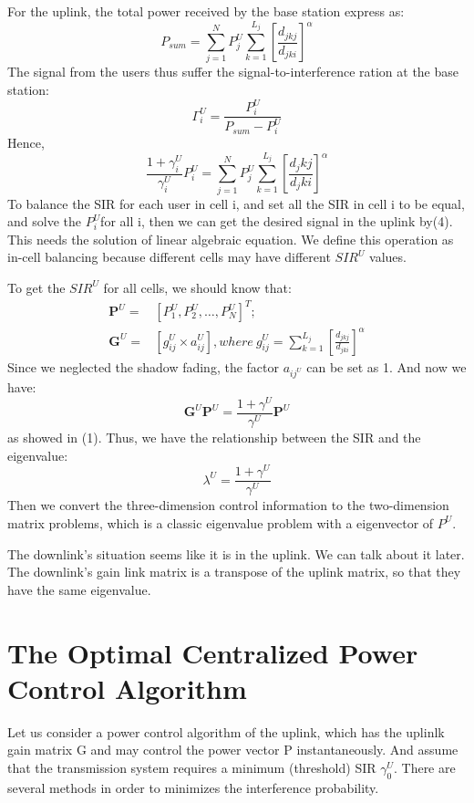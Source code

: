 \documentclass[conference]{IEEEtran}
\begin{document}
For the uplink, the total power received by the base station express as:\begin{equation}
P_{sum} = \sum_{j=1}^N P_j^U \sum_{k=1}^{L_j} \left[ \frac{d_{jkj}}{d_{jki}}\right] ^{\alpha}
\end{equation}
The signal from the users thus suffer the signal-to-interference ration at the base station:
\begin{equation*}
\Gamma_i^U = \frac{P_i^U}{P_{sum}-P_i^U}
\end{equation*}
Hence,
\begin{equation}
\frac{1+\gamma_i^U}{\gamma_i^U}P_i^U = \sum_{j=1}^N P_j^U \sum_{k=1}^{L_j} \left[\frac{d_jkj}{d_jki}\right] ^{\alpha}
\end{equation}
To balance the SIR for each user in cell i, and set all the SIR  in cell i to be equal, and solve the $P_i^U$for all i, then we can get the desired signal in the uplink by(4). This needs the solution of linear algebraic equation. We define this operation as in-cell balancing because different cells may have different $SIR^U$ values.

To get the $SIR^U$ for all cells, we should know that:
\begin{align}
\bm {P}^U =& \left[ P^U_1, P^U_2,\dots,P^U_N \right]^T; \nonumber \\
\bm {G}^U =& \left[ g^U_{ij}\times a_{ij}^U\right], where \ g^U_{ij} = \sum_{k=1}^{L_j} \left[ \frac{d_{jkj}}{d_{jki}}\right] ^{\alpha}
\end{align}
Since we neglected the shadow fading, the factor $a_{ij^U}$ can be set as 1. And now we have:
\begin{equation}
\bm G^U\bm P^U = \frac{1+\gamma^U}{\gamma^U}\bm P^U
\end{equation}
as showed in (1).
Thus, we have the relationship between the SIR and the eigenvalue:
\begin{equation}
\lambda^U = \frac{1+\gamma^U}{\gamma^U}
\end{equation}
Then we convert the three-dimension control information to the two-dimension matrix problems, which is a classic eigenvalue problem with a eigenvector of $P^U$. 

The downlink's situation seems like it is in the uplink. We can talk about it later. The downlink's gain link matrix is a transpose of the uplink matrix, so that they have the same eigenvalue. 


\section{The Optimal Centralized Power Control Algorithm}
Let us consider a power control algorithm of the uplink, which has the uplinlk gain matrix G and may control the power vector P instantaneously. And assume that the transmission system requires a minimum (threshold) SIR $\gamma_0^U$. There are several methods in order to minimizes the interference probability\cite{zander1992performance}.
\end{document}
